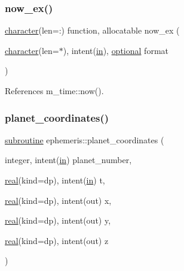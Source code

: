 \subsubsection{\texorpdfstring{now\+\_\+ex()}{now\_ex()}}
{\footnotesize\ttfamily \hyperlink{option__stopwatch_83_8txt_abd4b21fbbd175834027b5224bfe97e66}{character}(len=\+:) function, allocatable now\+\_\+ex (\begin{DoxyParamCaption}\item[{\hyperlink{option__stopwatch_83_8txt_abd4b21fbbd175834027b5224bfe97e66}{character}(len=$\ast$), intent(\hyperlink{M__journal_83_8txt_afce72651d1eed785a2132bee863b2f38}{in}), \hyperlink{option__stopwatch_83_8txt_aa4ece75e7acf58a4843f70fe18c3ade5}{optional}}]{format }\end{DoxyParamCaption})\hspace{0.3cm}{\ttfamily [private]}}



References m\+\_\+time\+::now().

\mbox{\label{M__time_8f90_a7d6b522799e158810bf530a1dedbc03e}} 
\subsubsection{\texorpdfstring{planet\+\_\+coordinates()}{planet\_coordinates()}}
{\footnotesize\ttfamily \hyperlink{M__stopwatch_83_8txt_acfbcff50169d691ff02d4a123ed70482}{subroutine} ephemeris\+::planet\+\_\+coordinates (\begin{DoxyParamCaption}\item[{integer, intent(\hyperlink{M__journal_83_8txt_afce72651d1eed785a2132bee863b2f38}{in})}]{planet\+\_\+number,  }\item[{\hyperlink{read__watch_83_8txt_abdb62bde002f38ef75f810d3a905a823}{real}(kind=dp), intent(\hyperlink{M__journal_83_8txt_afce72651d1eed785a2132bee863b2f38}{in})}]{t,  }\item[{\hyperlink{read__watch_83_8txt_abdb62bde002f38ef75f810d3a905a823}{real}(kind=dp), intent(out)}]{x,  }\item[{\hyperlink{read__watch_83_8txt_abdb62bde002f38ef75f810d3a905a823}{real}(kind=dp), intent(out)}]{y,  }\item[{\hyperlink{read__watch_83_8txt_abdb62bde002f38ef75f810d3a905a823}{real}(kind=dp), intent(out)}]{z }\end{DoxyParamCaption})\hspace{0.3cm}{\ttfamily [private]}}

